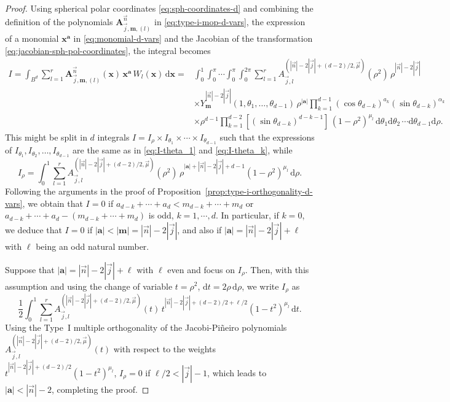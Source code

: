 \documentclass[a4paper]{article}
\theoremstyle{plain}
\theoremstyle{definition}
\newcommand{\dr}{\mathrm{d}}
\begin{document}
    \begin{proof}
    Using spherical polar coordinates \eqref{eq:sph-coordinates-d} and combining the definition of the polynomials $\mathbf A_{\vec j,\mathbf m,(l)}^{\vec n}$ in \eqref{eq:type-i-mop-d-vars}, the expression of a monomial $\mathbf x^{\mathbf a}$ in \eqref{eq:monomial-d-vars} and the Jacobian of the transformation \eqref{eq:jacobian-sph-pol-coordinates}, the integral becomes
    \begin{equation*}
        \begin{aligned}
            I=\int_{B^d}\sum_{l=1}^r \mathbf A_{\vec j,\mathbf m,(l)}^{\vec n}(\mathbf x)\, \mathbf x^{\mathbf a} \, W_l(\mathbf x)\, \dr \mathbf x = & \int_0^1\int_0^{\pi}\cdots\int_0^\pi\int_{0}^{2\pi} \sum_{l=1}^r  A_{\vec j,l}^{(|\vec n|-2|\vec j|+(d-2)/2,\vec \mu)}(\rho^2)\, \rho^{|\vec n|-2|\vec j|}\\&\times Y_{\mathbf m}^{|\vec n|-2|\vec j|}(1,\theta_1,\dots,\theta_{d-1})\, \rho^{|\mathbf a|}\prod_{k=1}^{d-1}(\cos\theta_{d-k})^{a_{k}}(\sin\theta_{d-k})^{\alpha_k} \\
           &  \times\rho^{d-1} \prod_{k=1}^{d-2}[(\sin\theta_{d-k})^{d-k-1}] \,(1-\rho^2)^{\mu_l}\,\dr\theta_{1}\dr\theta_{2}\,\cdots\dr\theta_{d-1}\dr \rho.  
        \end{aligned}
    \end{equation*}
    This might be split in $d$ integrals $I=I_{\rho}\times I_{\theta_1}\times\cdots\times I_{\theta_{d-1}}$ such that the expressions of $I_{\theta_1},I_{\theta_2},\dots, I_{\theta_{d-1}}$ are the same as in \eqref{eq:I-theta_1} and \eqref{eq:I-theta_k}, while
    $$
    I_\rho = \int_0^1\sum_{l=1}^r A_{\vec j,l}^{(|\vec n|-2|\vec j|+(d-2)/2,\vec \mu)}(\rho^2)\, \rho^{|\mathbf{a}|+|\vec n|-2|\vec j|+d-1}(1-\rho^2)^{\mu_l}\,\dr \rho.
    $$
    Following the arguments in the proof of Proposition~\ref{prop:type-i-orthogonality-d-vars}, we obtain that $I=0$ if $a_{d-k}+\cdots+a_{d} < m_{d-k}+\cdots + m_{d}$ or $a_{d-k}+\cdots+a_{d} -( m_{d-k}+\cdots + m_{d})$ is odd, $k=1,\cdots,d$. In particular, if $k=0$, we deduce that $I=0$ if $|\mathbf a|<|\mathbf m|=|\vec n|-2|\vec j|$, and also if $|\mathbf a|=|\vec n|-2|\vec j|+\ell$ with $\ell$ being an odd natural number.

    Suppose that $|\mathbf a|=|\vec n|-2|\vec j|+\ell$ with $\ell$ even and focus on $I_\rho$. Then, with this assumption and using the change of variable $t=\rho^2$, $\dr t =2\rho\, \dr \rho$, we write $I_\rho$ as
    $$
    \dfrac 1 2  \int_0^1\sum_{l=1}^r A_{\vec j,l}^{(|\vec n|-2|\vec j|+(d-2)/2,\vec \mu)}(t)\, t^{|\vec n|-2|\vec j|+(d-2)/2+\ell/2}(1-t^2)^{\mu_l}\,\dr t.
    $$
    Using the Type~I multiple orthogonality of the Jacobi-Pi\~neiro polynomials $A_{\vec j,l}^{(|\vec n|-2|\vec j|+(d-2)/2,\vec \mu)}(t)$ with respect to the weights $t^{|\vec n|-2|\vec j|+(d-2)/2}(1-t^2)^{\mu_l}$, $I_\rho=0$ if $\ell/2<|\vec j|-1$, which leads to $|\mathbf a|<|\vec n|-2$, completing the proof. 
    \end{proof}
\end{document}
